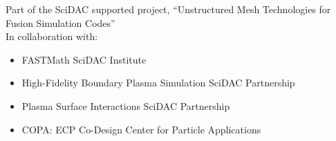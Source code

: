 \documentclass[aspectratio=169]{beamer}
\begin{document}
\begin{frame}
\begin{columns}
\begin{column}{.33\linewidth}
    \end{column}
  \end{columns}
  \vspace{.3cm}
  Part of the SciDAC supported project, ``Unstructured Mesh Technologies for Fusion Simulation Codes'' \\
  In collaboration with:
  \begin{itemize}
  \item FASTMath SciDAC Institute
  \item High-Fidelity Boundary Plasma Simulation SciDAC Partnership
  \item Plasma Surface Interactions SciDAC Partnership
  \item COPA: ECP Co-Design Center for Particle Applications
  \end{itemize}
\end{frame}
\end{document}
